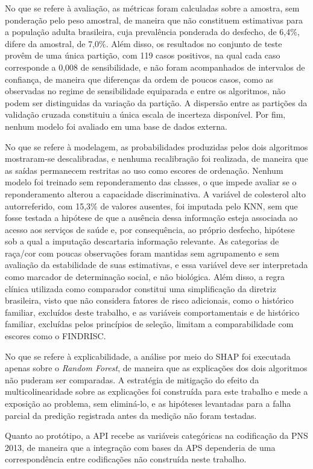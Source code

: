 No que se refere à avaliação, as métricas foram calculadas sobre a amostra, sem ponderação pelo peso amostral, de maneira que não constituem estimativas para a população adulta brasileira, cuja prevalência ponderada do desfecho, de 6,4\%, difere da amostral, de 7,0\%. Além disso, os resultados no conjunto de teste provêm de uma única partição, com 119 casos positivos, na qual cada caso corresponde a 0,008 de sensibilidade, e não foram acompanhados de intervalos de confiança, de maneira que diferenças da ordem de poucos casos, como as observadas no regime de sensibilidade equiparada e entre os algoritmos, não podem ser distinguidas da variação da partição. A dispersão entre as partições da validação cruzada constituiu a única escala de incerteza disponível. Por fim, nenhum modelo foi avaliado em uma base de dados externa.

No que se refere à modelagem, as probabilidades produzidas pelos dois algoritmos mostraram-se descalibradas, e nenhuma recalibração foi realizada, de maneira que as saídas permanecem restritas ao uso como escores de ordenação. Nenhum modelo foi treinado sem reponderamento das classes, o que impede avaliar se o reponderamento alterou a capacidade discriminativa. A variável de colesterol alto autorreferido, com 15,3\% de valores ausentes, foi imputada pelo KNN, sem que fosse testada a hipótese de que a ausência dessa informação esteja associada ao acesso aos serviços de saúde e, por consequência, ao próprio desfecho, hipótese sob a qual a imputação descartaria informação relevante. As categorias de raça/cor com poucas observações foram mantidas sem agrupamento e sem avaliação da estabilidade de suas estimativas, e essa variável deve ser interpretada como marcador de determinação social, e não biológica. Além disso, a regra clínica utilizada como comparador constitui uma simplificação da diretriz brasileira, visto que não considera fatores de risco adicionais, como o histórico familiar, excluídos deste trabalho, e as variáveis comportamentais e de histórico familiar, excluídas pelos princípios de seleção, limitam a comparabilidade com escores como o FINDRISC.

No que se refere à explicabilidade, a análise por meio do SHAP foi executada apenas sobre o \textit{Random Forest}, de maneira que as explicações dos dois algoritmos não puderam ser comparadas. A estratégia de mitigação do efeito da multicolinearidade sobre as explicações foi construída para este trabalho e mede a exposição ao problema, sem eliminá-lo, e as hipóteses levantadas para a falha parcial da predição registrada antes da medição não foram testadas.

Quanto ao protótipo, a API recebe as variáveis categóricas na codificação da PNS 2013, de maneira que a integração com bases da APS dependeria de uma correspondência entre codificações não construída neste trabalho.
